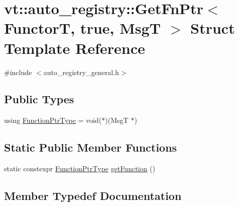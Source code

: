 \hypertarget{structvt_1_1auto__registry_1_1_get_fn_ptr_3_01_functor_t_00_01true_00_01_msg_t_01_4}{}\section{vt\+:\+:auto\+\_\+registry\+:\+:Get\+Fn\+Ptr$<$ FunctorT, true, MsgT $>$ Struct Template Reference}
\label{structvt_1_1auto__registry_1_1_get_fn_ptr_3_01_functor_t_00_01true_00_01_msg_t_01_4}


{\ttfamily \#include $<$auto\+\_\+registry\+\_\+general.\+h$>$}

\subsection*{Public Types}
\begin{DoxyCompactItemize}
\item 
using \hyperlink{structvt_1_1auto__registry_1_1_get_fn_ptr_3_01_functor_t_00_01true_00_01_msg_t_01_4_ae65c486f2f9a3ff20b3e79692dc9b1a4}{Function\+Ptr\+Type} = void($\ast$)(MsgT $\ast$)
\end{DoxyCompactItemize}
\subsection*{Static Public Member Functions}
\begin{DoxyCompactItemize}
\item 
static constexpr \hyperlink{structvt_1_1auto__registry_1_1_get_fn_ptr_3_01_functor_t_00_01true_00_01_msg_t_01_4_ae65c486f2f9a3ff20b3e79692dc9b1a4}{Function\+Ptr\+Type} \hyperlink{structvt_1_1auto__registry_1_1_get_fn_ptr_3_01_functor_t_00_01true_00_01_msg_t_01_4_a54bc99125c7986f3ba1c480414e2b76d}{get\+Function} ()
\end{DoxyCompactItemize}


\subsection{Member Typedef Documentation}
\mbox{\label{structvt_1_1auto__registry_1_1_get_fn_ptr_3_01_functor_t_00_01true_00_01_msg_t_01_4_ae65c486f2f9a3ff20b3e79692dc9b1a4}} 
